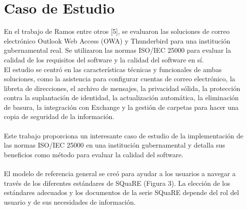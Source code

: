 \documentclass[https://www.overleaf.com/project/63761df255a8a9f4a15c3579
	letterpaper, %
	10pt, %
]{CSUniSchoolLabReport}
\begin{document}
    \section{Caso de Estudio}
        En el trabajo de Ramos entre otros [5], se evaluaron las soluciones de correo electrónico Outlook Web Access (OWA) y Thunderbird para una institución gubernamental real. Se utilizaron las normas ISO/IEC 25000 para evaluar la calidad de los requisitos del software y la calidad del software en sí. 
        \\
        El estudio se centró en las características técnicas y funcionales de ambas soluciones, como la asistencia para configurar cuentas de correo electrónico, la libreta de direcciones, el archivo de mensajes, la privacidad sólida, la protección contra la suplantación de identidad, la actualización automática, la eliminación de basura, la integración con Exchange y la gestión de carpetas para hacer una copia de seguridad de la información. 
        \\\\
        Este trabajo proporciona un interesante caso de estudio de la implementación de las normas ISO/IEC 25000 en una institución gubernamental y detalla sus beneficios como método para evaluar la calidad del software.
        \\\\
        El modelo de referencia general se creó para ayudar a los usuarios a navegar a través de los diferentes estándares de SQuaRE (Figura 3). La elección de los estándares adecuados y los documentos de la serie SQuaRE depende del rol del usuario y de sus necesidades de información.
\end{document}
